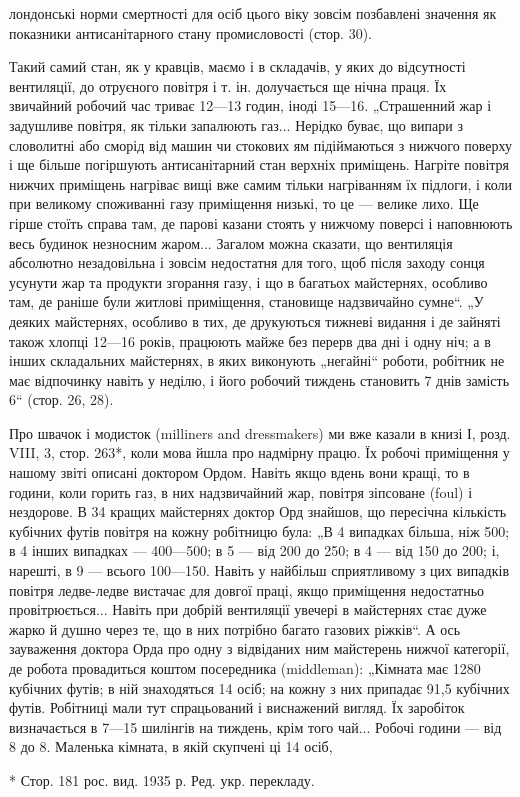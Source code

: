 \parcont{}  %
лондонські норми смертності для осіб цього віку зовсім позбавлені значення як показники
антисанітарного стану промисловості (стор. 30).

Такий самий стан, як у кравців, маємо і в складачів, у яких
до відсутності вентиляції, до отруєного повітря і т. ін. долучається ще нічна праця. Їх звичайний
робочий час триває
12—13 годин, іноді 15—16. „Страшенний жар і задушливе повітря, як тільки запалюють газ... Нерідко
буває, що випари
з словолитні або сморід від машин чи стокових ям підіймаються
з нижчого поверху і ще більше погіршують антисанітарний стан
верхніх приміщень. Нагріте повітря нижчих приміщень нагріває
вищі вже самим тільки нагріванням їх підлоги, і коли при великому споживанні газу приміщення низькі,
то це — велике лихо.
Ще гірше стоїть справа там, де парові казани стоять у нижчому
поверсі і наповнюють весь будинок незносним жаром... Загалом можна сказати, що вентиляція абсолютно
незадовільна
і зовсім недостатня для того, щоб після заходу сонця усунути
жар та продукти згорання газу, і що в багатьох майстернях,
особливо там, де раніше були житлові приміщення, становище
надзвичайно сумне“. „У деяких майстернях, особливо в тих,
де друкуються тижневі видання і де зайняті також хлопці 12—16 років, працюють майже без перерв два
дні і одну ніч; а в інших складальних майстернях, в яких виконують „негайні“ роботи,
робітник не має відпочинку навіть у неділю, і його робочий
тиждень становить 7 днів замість 6“ (стор. 26, 28).

Про швачок і модисток (milliners and dressmakers) ми вже
казали в книзі І, розд. VIII, 3, стор. 263*, коли мова йшла про
надмірну працю. Їх робочі приміщення у нашому звіті описані
доктором Ордом. Навіть якщо вдень вони кращі, то в години,
коли горить газ, в них надзвичайний жар, повітря зіпсоване (foul)
і нездорове. В 34 кращих майстернях доктор Орд знайшов, що
пересічна кількість кубічних футів повітря на кожну робітницю була: „В 4 випадках більша, ніж 500; в
4 інших випадках —
400—500; в 5 — від 200 до 250; в 4 — від 150 до 200; і, нарешті,
в 9 — всього 100—150. Навіть у найбільш сприятливому з цих
випадків повітря ледве-ледве вистачає для довгої праці, якщо
приміщення недостатньо провітрюється... Навіть при добрій вентиляції увечері в майстернях стає дуже
жарко й душно через
те, що в них потрібно багато газових ріжків“. А ось зауваження
доктора Орда про одну з відвіданих ним майстерень нижчої
категорії, де робота провадиться коштом посередника (middleman):
„Кімната має 1280 кубічних футів; в ній знаходяться
14 осіб; на кожну з них припадає 91,5 кубічних футів. Робітниці мали тут спрацьований і виснажений
вигляд. Їх заробіток
визначається в 7—15 шилінгів на тиждень, крім того чай... Робочі
години — від 8 до 8. Маленька кімната, в якій скупчені ці 14 осіб,

* Стор. 181 рос. вид. 1935 р. Ред. укр. перекладу.
\parbreak{}  %
